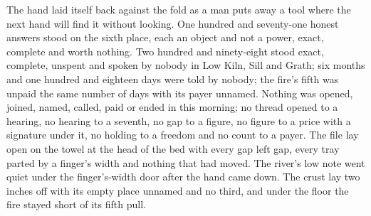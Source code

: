The hand laid itself back against the fold as a man puts away a tool where the next hand will find it without looking. One hundred and seventy-one honest answers stood on the sixth place, each an object and not a power, exact, complete and worth nothing. Two hundred and ninety-eight stood exact, complete, unspent and spoken by nobody in Low Kiln, Sill and Grath; six months and one hundred and eighteen days were told by nobody; the fire's fifth was unpaid the same number of days with its payer unnamed. Nothing was opened, joined, named, called, paid or ended in this morning; no thread opened to a hearing, no hearing to a seventh, no gap to a figure, no figure to a price with a signature under it, no holding to a freedom and no count to a payer. The file lay open on the towel at the head of the bed with every gap left gap, every tray parted by a finger's width and nothing that had moved. The river's low note went quiet under the finger's-width door after the hand came down. The crust lay two inches off with its empty place unnamed and no third, and under the floor the fire stayed short of its fifth pull.

